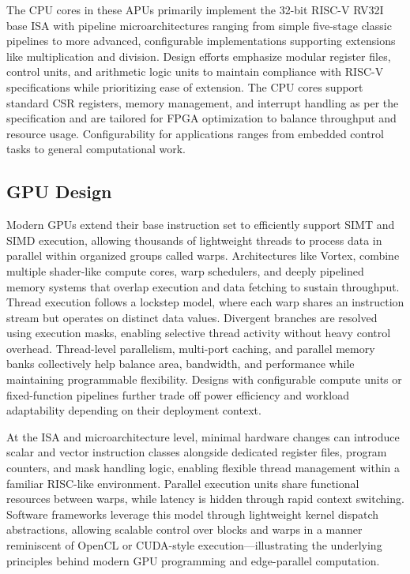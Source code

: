 \documentclass[a4paper,twoside]{article}
\begin{document}
The CPU cores in these APUs primarily implement the 32-bit RISC-V RV32I base ISA with pipeline microarchitectures ranging from simple five-stage classic pipelines to more advanced, configurable implementations supporting extensions like multiplication and division. Design efforts emphasize modular register files, control units, and arithmetic logic units to maintain compliance with RISC-V specifications while prioritizing ease of extension. The CPU cores support standard CSR registers, memory management, and interrupt handling as per the specification and are tailored for FPGA optimization to balance throughput and resource usage. Configurability for applications ranges from embedded control tasks to general computational work.

\subsection{GPU Design}

Modern GPUs extend their base instruction set to efficiently support SIMT and SIMD execution, allowing thousands of lightweight threads to process data in parallel within organized groups called warps. Architectures like Vortex, combine multiple shader-like compute cores, warp schedulers, and deeply pipelined memory systems that overlap execution and data fetching to sustain throughput. Thread execution follows a lockstep model, where each warp shares an instruction stream but operates on distinct data values. Divergent branches are resolved using execution masks, enabling selective thread activity without heavy control overhead. Thread-level parallelism, multi-port caching, and parallel memory banks collectively help balance area, bandwidth, and performance while maintaining programmable flexibility. Designs with configurable compute units or fixed-function pipelines further trade off power efficiency and workload adaptability depending on their deployment context.  

At the ISA and microarchitecture level, minimal hardware changes can introduce scalar and vector instruction classes alongside dedicated register files, program counters, and mask handling logic, enabling flexible thread management within a familiar RISC-like environment. Parallel execution units share functional resources between warps, while latency is hidden through rapid context switching. Software frameworks leverage this model through lightweight kernel dispatch abstractions, allowing scalable control over blocks and warps in a manner reminiscent of OpenCL or CUDA-style execution—illustrating the underlying principles behind modern GPU programming and edge-parallel computation.
\end{document}
